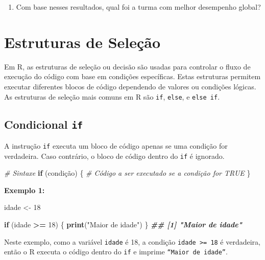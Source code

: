 \documentclass[
]{book}
\newenvironment{Shaded}{\begin{snugshade}}{\end{snugshade}}
\newcommand{\CommentTok}[1]{\textcolor[rgb]{0.56,0.35,0.01}{\textit{#1}}}
\newcommand{\ControlFlowTok}[1]{\textcolor[rgb]{0.13,0.29,0.53}{\textbf{#1}}}
\newcommand{\DecValTok}[1]{\textcolor[rgb]{0.00,0.00,0.81}{#1}}
\newcommand{\DocumentationTok}[1]{\textcolor[rgb]{0.56,0.35,0.01}{\textbf{\textit{#1}}}}
\newcommand{\FunctionTok}[1]{\textcolor[rgb]{0.13,0.29,0.53}{\textbf{#1}}}
\newcommand{\NormalTok}[1]{#1}
\newcommand{\OtherTok}[1]{\textcolor[rgb]{0.56,0.35,0.01}{#1}}
\newcommand{\SpecialCharTok}[1]{\textcolor[rgb]{0.81,0.36,0.00}{\textbf{#1}}}
\newcommand{\StringTok}[1]{\textcolor[rgb]{0.31,0.60,0.02}{#1}}
\providecommand{\tightlist}{%
  \setlength{\itemsep}{0pt}\setlength{\parskip}{0pt}}
\begin{document}
\begin{enumerate}
\def\labelenumi{(\alph{enumi})}
\setcounter{enumi}{3}
\tightlist
\item
  Com base nesses resultados, qual foi a turma com melhor desempenho global?
\end{enumerate}

\chapter{Estruturas de Seleção}\label{estruturas-de-seleuxe7uxe3o}

Em R, as estruturas de seleção ou decisão são usadas para controlar o
fluxo de execução do código com base em condições específicas. Estas
estruturas permitem executar diferentes blocos de código dependendo de
valores ou condições lógicas. As estruturas de seleção mais comuns em R
são \texttt{if}, \texttt{else}, e \texttt{else\ if}.

\section{\texorpdfstring{Condicional \texttt{if}}{Condicional if}}\label{condicional-if}

A instrução \texttt{if} executa um bloco de código apenas se uma condição for
verdadeira. Caso contrário, o bloco de código dentro do \texttt{if} é ignorado.

\begin{Shaded}
\begin{Highlighting}[]
\CommentTok{\# Sintaxe   }
\ControlFlowTok{if}\NormalTok{ (condição) \{}
      \CommentTok{\# Código a ser executado se a condição for TRUE}
\NormalTok{\}}
\end{Highlighting}
\end{Shaded}

\textbf{Exemplo 1:}

\begin{Shaded}
\begin{Highlighting}[]
\NormalTok{idade }\OtherTok{\textless{}{-}} \DecValTok{18}

\ControlFlowTok{if}\NormalTok{ (idade }\SpecialCharTok{\textgreater{}=} \DecValTok{18}\NormalTok{) \{}
      \FunctionTok{print}\NormalTok{(}\StringTok{"Maior de idade"}\NormalTok{)}
\NormalTok{\}}
\DocumentationTok{\#\# [1] "Maior de idade"}
\end{Highlighting}
\end{Shaded}

Neste exemplo, como a variável \texttt{idade} é 18, a condição \texttt{idade\ \textgreater{}=\ 18} é
verdadeira, então o R executa o código dentro do \texttt{if} e imprime
\texttt{“Maior\ de\ idade”}.
\end{document}
